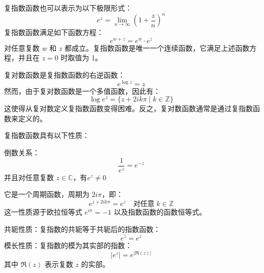 复指数函数也可以表示为以下极限形式：
$$
e^z = \lim_{n \to \infty} \left(1 + \frac{z}{n} \right)^n~
$$
复指数函数满足如下函数方程：
$$
e^{w + z} = e^w \cdot e^z~
$$
对任意复数 $w$ 和 $z$ 都成立。复指数函数是唯一一个连续函数，它满足上述函数方程，并且在 $z = 0$ 时取值为 1。

复对数函数是复指数函数的右逆函数：
$$
e^{\log z} = z~
$$
然而，由于复对数函数是一个多值函数，因此有：
$$
\log e^z = \{ z + 2ik\pi \mid k \in \mathbb{Z} \}~
$$
这使得从复对数定义复指数函数变得困难。反之，复对数函数通常是通过复指数函数来定义的。

复指数函数具有以下性质：

倒数关系：
  $$
  \frac{1}{e^z} = e^{-z}~
  $$
并且对任意复数 $z \in \mathbb{C}$，有$e^z \neq 0$

它是一个周期函数，周期为 $2i\pi$，即：
  $$
  e^{z + 2ik\pi} = e^z \quad \text{对任意} \; k \in \mathbb{Z}~
  $$
这一性质源于欧拉恒等式 $e^{i\pi} = -1$ 以及指数函数的函数恒等式。

共轭性质：复指数的共轭等于共轭后的指数函数：
  $$
  \overline{e^z} = e^{\overline{z}}~
  $$
模长性质：复指数的模为其实部的指数：
  $$
  |e^z| = e^{|\Re(z)|}~
  $$
其中 $\Re(z)$ 表示复数 $z$ 的实部。
